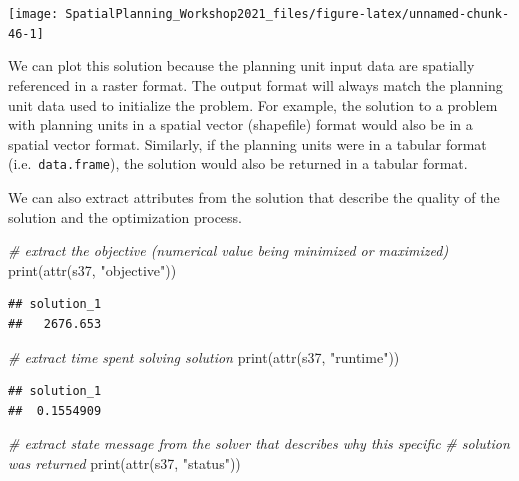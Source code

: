 \documentclass[
  12pt,
]{book}
\newenvironment{Shaded}{\begin{snugshade}}{\end{snugshade}}
\newcommand{\CommentTok}[1]{\textcolor[rgb]{0.56,0.35,0.01}{\textit{#1}}}
\newcommand{\FunctionTok}[1]{\textcolor[rgb]{0.00,0.00,0.00}{#1}}
\newcommand{\NormalTok}[1]{#1}
\newcommand{\StringTok}[1]{\textcolor[rgb]{0.31,0.60,0.02}{#1}}
\begin{document}
\begin{center}\texttt{[image: SpatialPlanning\_Workshop2021\_files/figure-latex/unnamed-chunk-46-1]} \end{center}

We can plot this solution because the planning unit input data are spatially referenced in a raster format. The output format will always match the planning unit data used to initialize the problem. For example, the solution to a problem with planning units in a spatial vector (shapefile) format would also be in a spatial vector format. Similarly, if the planning units were in a tabular format (i.e.~\texttt{data.frame}), the solution would also be returned in a tabular format.

We can also extract attributes from the solution that describe the quality of the solution and the optimization process.

\begin{Shaded}
\begin{Highlighting}[]
\CommentTok{\# extract the objective (numerical value being minimized or maximized)}
\FunctionTok{print}\NormalTok{(}\FunctionTok{attr}\NormalTok{(s37, }\StringTok{"objective"}\NormalTok{))}
\end{Highlighting}
\end{Shaded}

\begin{verbatim}
## solution_1 
##   2676.653
\end{verbatim}

\begin{Shaded}
\begin{Highlighting}[]
\CommentTok{\# extract time spent solving solution}
\FunctionTok{print}\NormalTok{(}\FunctionTok{attr}\NormalTok{(s37, }\StringTok{"runtime"}\NormalTok{))}
\end{Highlighting}
\end{Shaded}

\begin{verbatim}
## solution_1 
##  0.1554909
\end{verbatim}

\begin{Shaded}
\begin{Highlighting}[]
\CommentTok{\# extract state message from the solver that describes why this specific}
\CommentTok{\# solution was returned}
\FunctionTok{print}\NormalTok{(}\FunctionTok{attr}\NormalTok{(s37, }\StringTok{"status"}\NormalTok{))}
\end{Highlighting}
\end{Shaded}
\end{document}

